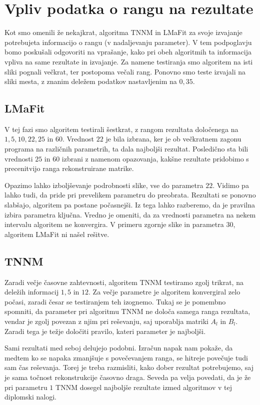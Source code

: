 \section{Vpliv podatka o rangu na rezultate}
Kot smo omenili že nekajkrat, algoritma TNNM in LMaFit za svoje izvajanje potrebujeta informacijo o rangu (v nadaljevanju parameter). V tem podpoglavju bomo poskušali odgovoriti na vprašanje, kako pri obeh algoritmih ta informacija vpliva na same rezultate in izvajanje. Za namene testiranja smo algoritem na isti sliki pognali večkrat, ter postopoma večali rang. Ponovno smo teste izvajali na sliki mesta, z znanim deležem podatkov nastavljenim na $0,35$.

\subsection{LMaFit}
V tej fazi smo algoritem testirali šestkrat, z rangom rezultata določenega na
$1, 5, 10, 22, 25$ in $60$. Vrednost $22$ je bila izbrana, ker je ob večkratnem zagonu programa na različnih parametrih, ta dala najboljši rezultat. Posledično sta bili vrednosti $25$ in $60$ izbrani z namenom opazovanja, kakšne rezultate pridobimo s precenitvijo ranga rekonstruirane matrike. 


Opazimo lahko izboljševanje podrobnosti slike, vse do parametra $22$. Vidimo pa lahko tudi, da pride pri prevelikem parametru do preobrata. Rezultati se ponovno slabšajo, algoritem pa postane počasnejši. Iz tega lahko razberemo, da je pravilna izbira parametra ključna. Vredno je omeniti, da za vrednosti parametra na nekem intervalu algoritem ne konvergira. V primeru zgornje slike in parametra $30$, algoritem LMaFit ni našel rešitve. 

\subsection{TNNM}
Zaradi večje časovne zahtevnosti, algoritem TNNM testiramo zgolj trikrat, na deležih informacij $1, 5$ in $12$. Za večje parametre je algoritem konvergiral zelo počasi, zaradi česar se testiranjem teh izognemo. Tukaj se je pomembno spomniti, da parameter pri algoritmu TNNM ne določa samega ranga rezultata, vendar je zgolj povezan z njim pri reševanju, saj uporablja matriki $A_l$ in $B_l$. Zaradi tega je težje določiti pravilo, kateri parameter je najboljši.


Sami rezultati med seboj delujejo podobni. Izračun napak nam pokaže, da medtem ko se napaka zmanjšuje s povečevanjem ranga, se hitreje povečuje tudi sam čas reševanja. Torej je treba razmisliti, kako dober rezultat potrebujemo, saj je sama točnost rekonstrukcije časovno draga. Seveda pa velja povedati, da je že pri parametru $1$ TNNM dosegel najboljše rezultate izmed algoritmov v tej diplomski nalogi.

